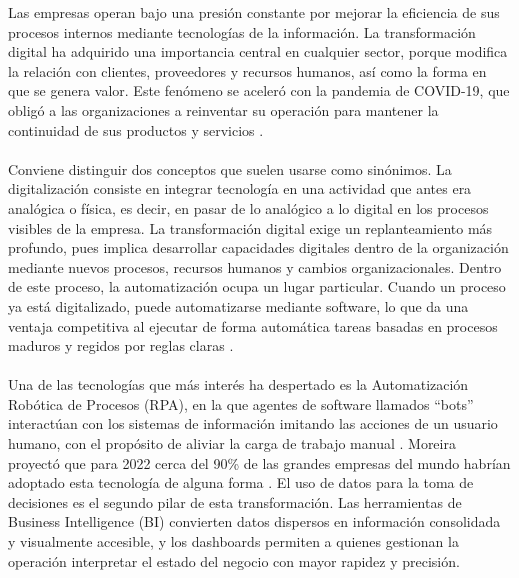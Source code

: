 Las empresas operan bajo una presión constante por mejorar la eficiencia de sus procesos internos mediante tecnologías de la información. La transformación digital ha adquirido una importancia central en cualquier sector, porque modifica la relación con clientes, proveedores y recursos humanos, así como la forma en que se genera valor. Este fenómeno se aceleró con la pandemia de COVID-19, que obligó a las organizaciones a reinventar su operación para mantener la continuidad de sus productos y servicios \cite{moreira2023rpa}.\\ \\
Conviene distinguir dos conceptos que suelen usarse como sinónimos. La digitalización consiste en integrar tecnología en una actividad que antes era analógica o física, es decir, en pasar de lo analógico a lo digital en los procesos visibles de la empresa. La transformación digital exige un replanteamiento más profundo, pues implica desarrollar capacidades digitales dentro de la organización mediante nuevos procesos, recursos humanos y cambios organizacionales.
Dentro de este proceso, la automatización ocupa un lugar particular. Cuando un proceso ya está digitalizado, puede automatizarse mediante software, lo que da una ventaja competitiva al ejecutar de forma automática tareas basadas en procesos maduros y regidos por reglas claras \cite{moreira2023rpa}. \\ \\Una de las tecnologías que más interés ha despertado es la Automatización Robótica de Procesos (RPA), en la que agentes de software llamados ``bots'' interactúan con los sistemas de información imitando las acciones de un usuario humano, con el propósito de aliviar la carga de trabajo manual \cite{syed2020rpa}. Moreira proyectó que para 2022 cerca del 90\% de las grandes empresas del mundo habrían adoptado esta tecnología de alguna forma \cite{moreira2023rpa}.
El uso de datos para la toma de decisiones es el segundo pilar de esta transformación. Las herramientas de Business Intelligence (BI) convierten datos dispersos en información consolidada y visualmente accesible, y los dashboards permiten a quienes gestionan la operación interpretar el estado del negocio con mayor rapidez y precisión.\\ \\
